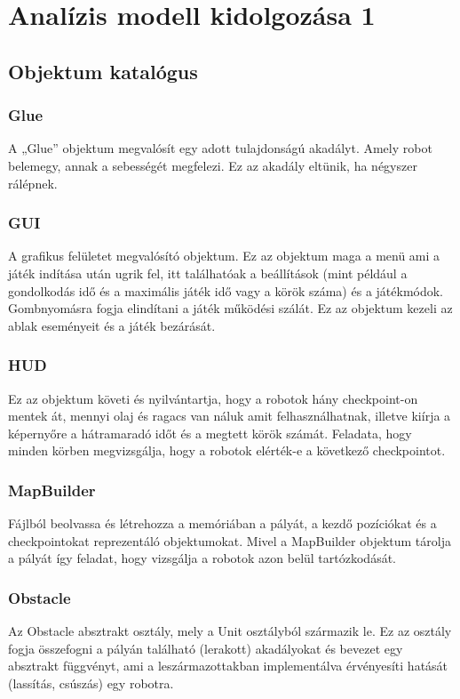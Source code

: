 %
\chapter{Analízis modell kidolgozása 1}

\thispagestyle{fancy}

\section{Objektum katalógus}

\subsection{Glue}
A „Glue” objektum megvalósít egy adott tulajdonságú akadályt. Amely robot belemegy, annak a sebességét megfelezi. Ez az akadály eltünik, ha négyszer rálépnek.
\subsection{GUI}
A grafikus felületet megvalósító objektum. Ez az objektum maga a menü ami a játék indítása után ugrik fel, itt találhatóak a beállítások (mint például a gondolkodás idő és a maximális játék idő vagy a körök száma) és a játékmódok. Gombnyomásra fogja elindítani a játék működési szálát. Ez az objektum kezeli az ablak eseményeit és a játék bezárását.
\subsection{HUD}
Ez az objektum követi és nyilvántartja, hogy a robotok hány checkpoint-on mentek át, mennyi olaj és ragacs van náluk amit felhasználhatnak, illetve kiírja a képernyőre a hátramaradó időt és a megtett körök számát. Feladata, hogy minden körben megvizsgálja, hogy a robotok elérték-e a következő checkpointot.
\subsection{MapBuilder}
Fájlból beolvassa és létrehozza a memóriában a pályát, a kezdő pozíciókat és a checkpointokat reprezentáló objektumokat.  Mivel a  MapBuilder objektum tárolja a pályát így feladat, hogy vizsgálja a robotok azon belül tartózkodását.  
\subsection{Obstacle}
Az Obstacle absztrakt osztály, mely a Unit osztályból származik le. Ez az osztály fogja összefogni a pályán található (lerakott) akadályokat és bevezet egy absztrakt függvényt, ami a leszármazottakban implementálva érvényesíti hatását (lassítás, csúszás) egy robotra.
